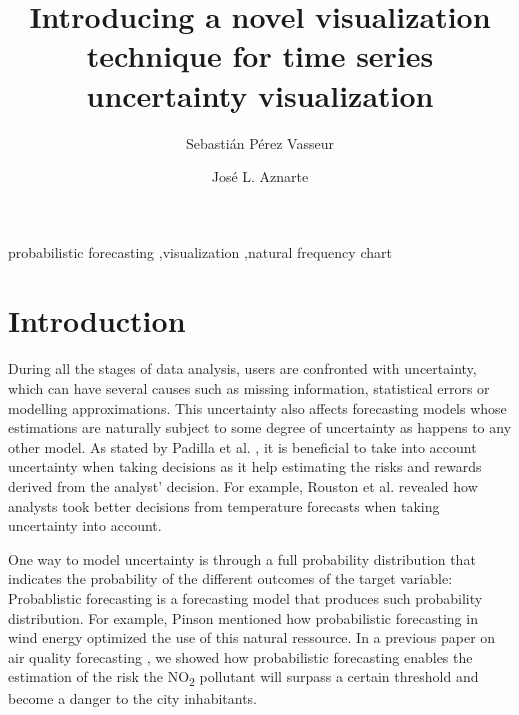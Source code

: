 \documentclass[a4paper,3p,sort&compress]{elsarticle}
\begin{document}
\linenumbers

\newcommand{\no}{NO\textsubscript{2}\xspace}
\newcommand{\ts}{\textsuperscript}

\begin{frontmatter}

  \title{Introducing a novel visualization technique for time series uncertainty visualization}


  \author{Sebasti\'an P\'erez Vasseur}
  \author{Jos\'e L. Aznarte}
  \address{Artificial Intelligence Department\\Universidad Nacional de
    Educaci\'on a Distancia --- UNED\\c/ Juan del Rosal, 16, Madrid, Spain}
  

\begin{abstract}
  
\end{abstract}

\begin{keyword}
probabilistic forecasting \sep visualization \sep natural frequency chart
\end{keyword}

\end{frontmatter}


\section{Introduction}
\label{sec:intro}

During all the stages of data analysis, users are confronted with uncertainty, which can have 
several causes such as missing information, statistical errors or modelling approximations.
This uncertainty also affects forecasting models whose estimations are naturally 
subject to some degree of uncertainty as happens to any other model. 
As stated by Padilla et al. \cite{padilla_uncertainty_2021}, it is beneficial to take into account uncertainty 
when taking decisions as it help estimating the risks and rewards derived from the analyst'
decision. For example, Rouston et al. \cite{roulston_laboratory_2006} 
revealed how analysts 
took better decisions from temperature forecasts when taking uncertainty into account. 

One way to model uncertainty is through a full 
probability distribution that indicates the probability of the different outcomes of the target variable:
Probablistic forecasting is a forecasting model that produces such probability distribution.
For example, Pinson \cite{pinson_non-parametric_2007} mentioned how probabilistic forecasting 
in wind energy optimized the use of this natural ressource. In a previous paper on air quality forecasting 
\cite{vasseur_comparing_2021}, we showed 
how probabilistic forecasting enables the estimation of the risk the \no pollutant will surpass a certain threshold 
and become a danger to the city inhabitants. 
\end{document}
